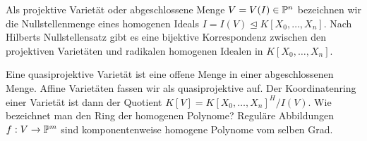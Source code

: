 Als projektive Varietät oder abgeschlossene Menge $V = V(I) \in \mathbb P^{n}$ bezeichnen wir die Nullstellenmenge eines homogenen Ideals $I = I(V) \unlhd K[X_0,\dots,X_n]$. Nach Hilberts Nullstellensatz gibt es eine bijektive Korrespondenz zwischen den projektiven Varietäten und radikalen homogenen Idealen in $K[X_0,\dots,X_n]$.

Eine quasiprojektive Varietät ist eine offene Menge in einer abgeschlossenen Menge. Affine Varietäten fassen wir als quasiprojektive auf. Der Koordinatenring einer Varietät ist dann der Quotient $K[V] = K[X_0,\dots,X_n]^H/I(V)$. \note Wie bezeichnet man den Ring der homogenen Polynome? Reguläre Abbildungen $f: V \rightarrow \mathbb P^{m}$ sind komponentenweise homogene Polynome vom selben Grad.



